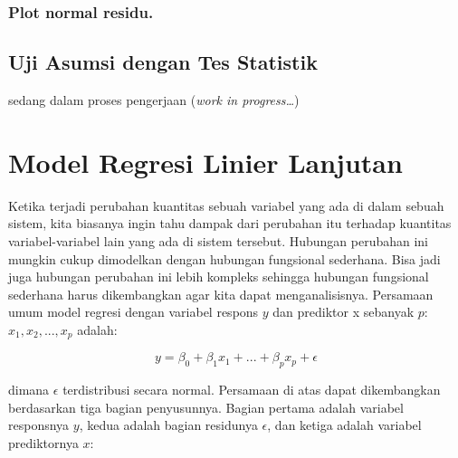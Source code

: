 \documentclass[
]{book}
\begin{document}
\hypertarget{plot-normal-residu.}{%
\subsection{Plot normal residu.}\label{plot-normal-residu.}}

\hypertarget{uji-asumsi-dengan-tes-statistik}{%
\section{Uji Asumsi dengan Tes Statistik}\label{uji-asumsi-dengan-tes-statistik}}

sedang dalam proses pengerjaan (\emph{work in progress\ldots{}})

\hypertarget{model-regresi-linier-lanjutan}{%
\chapter{Model Regresi Linier Lanjutan}\label{model-regresi-linier-lanjutan}}

Ketika terjadi perubahan kuantitas sebuah variabel yang ada di dalam sebuah sistem, kita biasanya ingin tahu dampak dari perubahan itu terhadap kuantitas variabel-variabel lain yang ada di sistem tersebut. Hubungan perubahan ini mungkin cukup dimodelkan dengan hubungan fungsional sederhana. Bisa jadi juga hubungan perubahan ini lebih kompleks sehingga hubungan fungsional sederhana harus dikembangkan agar kita dapat menganalisisnya.
Persamaan umum model regresi dengan variabel respons \(y\) dan prediktor x sebanyak \(p\): \(x_1, x_2, ... , x_p\) adalah:

\begin{equation}
y = \beta_0 + \beta_1x_1 + ... + \beta_px_p + \epsilon
\label{eq:persamaan-lanjutan}
\end{equation}

dimana \(\epsilon\) terdistribusi secara normal. Persamaan di atas dapat dikembangkan berdasarkan tiga bagian penyusunnya. Bagian pertama adalah variabel responsnya \(y\), kedua adalah bagian residunya \(\epsilon\), dan ketiga adalah variabel prediktornya \(x\):
\end{document}
